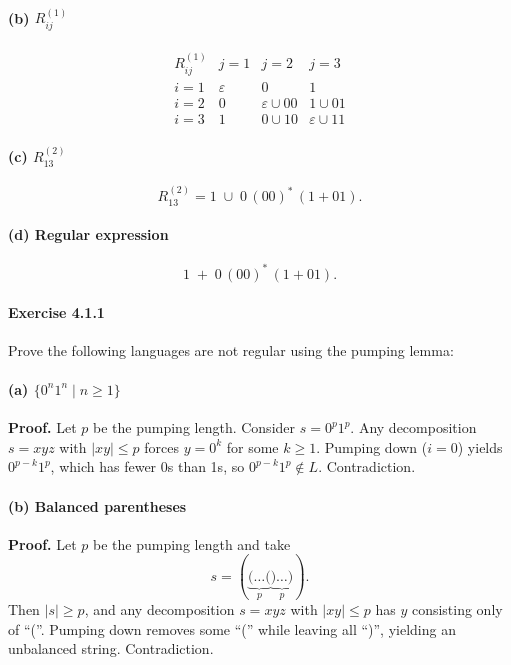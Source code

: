 \documentclass{article}
\theoremstyle{theorem}
\theoremstyle{definition}
\theoremstyle{remark}
\begin{document}
\paragraph{(b) \(R_{ij}^{(1)}\)}
\[
\begin{array}{c|ccc}
R_{ij}^{(1)} & j=1 & j=2 & j=3\\\hline
i=1 & \varepsilon & 0 & 1\\
i=2 & 0 & \varepsilon\cup00 & 1\cup01\\
i=3 & 1 & 0\cup10 & \varepsilon\cup11
\end{array}
\]
\paragraph{(c) \(R_{13}^{(2)}\)}
\[
R_{13}^{(2)} = 1 \;\cup\;0\,(00)^*\,(1+01).
\]
\paragraph{(d) Regular expression}
\[
1 \;+\;0\,(00)^*\,(1+01).
\]


\paragraph*{Exercise 4.1.1}
Prove the following languages are not regular using the pumping lemma:

\paragraph{(a) \(\{0^n1^n\mid n\ge1\}\)}
\textbf{Proof.} Let \(p\) be the pumping length. Consider \(s=0^p1^p\). Any decomposition \(s=xyz\) with \(\lvert xy\rvert\le p\) forces \(y=0^k\) for some \(k\ge1\). Pumping down (\(i=0\)) yields \(0^{p-k}1^p\), which has fewer 0s than 1s, so \(0^{p-k}1^p\notin L\). Contradiction.

\paragraph{(b) Balanced parentheses}
\textbf{Proof.} Let \(p\) be the pumping length and take 
\[
s = (\underbrace{( \dots (}_{p}\underbrace{) \dots )}_{p}).
\]
Then \(\lvert s\rvert\ge p\), and any decomposition \(s=xyz\) with \(\lvert xy\rvert\le p\) has \(y\) consisting only of “(”. Pumping down removes some “(” while leaving all “)”, yielding an unbalanced string. Contradiction.
\end{document}
